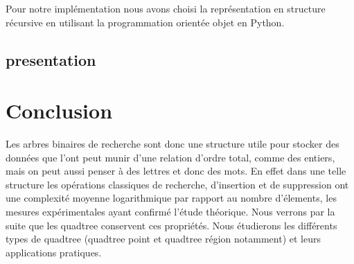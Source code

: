 \documentclass{report}
\begin{document}
Pour notre implémentation nous avons choisi la représentation en structure récursive en utilisant la programmation orientée objet en Python.



\section{presentation}


\chapter*{Conclusion}

Les arbres binaires de recherche sont donc une structure utile pour stocker des données que l'ont peut munir d'une relation d'ordre total, comme des entiers, mais on peut aussi penser à des lettres et donc des mots. En effet dans une telle structure les opérations classiques de recherche, d'insertion et de suppression ont une complexité moyenne logarithmique par rapport au nombre d'élements, les mesures expérimentales ayant confirmé l'étude théorique. Nous verrons par la suite que les quadtree conservent ces propriétés. Nous étudierons les différents types de quadtree (quadtree point et quadtree région notamment) et leurs applications pratiques.


\nocite{*}


\end{document}
